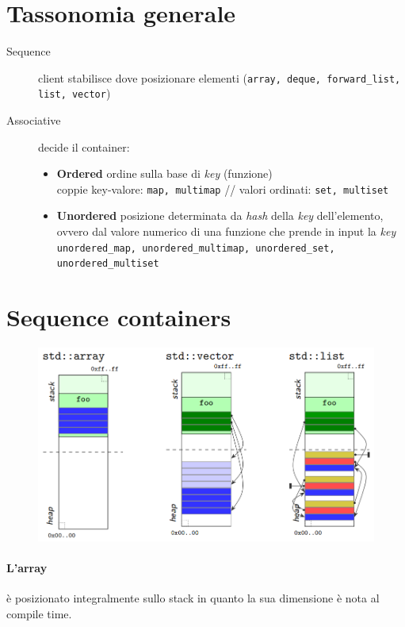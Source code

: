 \documentclass[10pt, oneside]{book}
\begin{document}
\section{Tassonomia generale}
\begin{description}
\item[Sequence] client stabilisce dove posizionare elementi (\texttt{array, deque, forward\_list, list, vector})
\item[Associative] decide il container:
\begin{itemize}
\item \textbf{Ordered} ordine sulla base di \textit{key} (funzione)
\\coppie key-valore: \texttt{map, multimap} // valori ordinati: \texttt{set, multiset}
\item \textbf{Unordered} posizione determinata da \textit{hash} della \textit{key} dell'elemento, ovvero dal valore numerico di una funzione che prende in input la \textit{key}
\\\texttt{unordered\_map, unordered\_multimap, unordered\_set, unordered\_multiset}
\end{itemize}
\end{description}

\section{Sequence containers}
\begin{figure}[h!]
\centering
\includegraphics[scale=0.7]{standard.png}
\end{figure}
\paragraph{L'array} è posizionato integralmente sullo stack in quanto la sua dimensione è nota al compile time.
\end{document}
